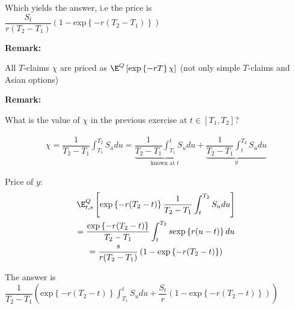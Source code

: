 \noindent Which yields the answer, i.e the price is $\dfrac{S_t}{r(T_2-T_1)}\left(1-\text{exp}\left\{-r(T_2-T_1)\right\}\right)$
\par\bigskip
\noindent\textbf{Remark:}\par
\noindent All $T$-claims $\chi$ are priced as $\E^Q\left[\text{exp}\left\{-rT\right\}\chi\right]$ (not only simple $T$-claims and Asian options)
\par\bigskip
\noindent\textbf{Remark:}\par
\noindent What is the value of $\chi$ in the previous exercise at $t \in[T_1,T_2]$?\par
\begin{equation*}
  \begin{gathered}
    \chi = \dfrac{1}{T_2-T_1}\int_{T_1}^{T_2}S_udu = \underbrace{\dfrac{1}{T_2-T_1}\int_{T_1}^{t}S_udu}_{\text{known at $t$}}+\underbrace{\dfrac{1}{T_2-T_1}\int_{t}^{T_2}S_udu}_{y}
  \end{gathered}
\end{equation*}
\par\bigskip
\noindent Price of $y$:
\begin{equation*}
  \begin{gathered}
    \E_{t,s}^Q\left[\text{exp}\left\{-r(T_2-t)\right\}\dfrac{1}{T_2-T_1}\int_{t}^{T_2}S_udu\right]\\
    =\dfrac{\text{exp}\left\{-r(T_2-t)\right\}}{T_2-T_1}\int_{t}^{T_2}s\text{exp}\left\{r(u-t)\right\}du\\
    = \dfrac{s}{r(T_2-T_1)}\left(1-\text{exp}\left\{-r(T_2-t)\right\}\right)
  \end{gathered}
\end{equation*}\par
\noindent The answer is $\dfrac{1}{T_2-T_1}\left(\text{exp}\left\{-r(T_2-t)\right\}\int_{T_1}^{t}S_udu+\dfrac{S_t}{r}\left(1-\text{exp}\left\{-r(T_2-t)\right\}\right)\right)$
\par\bigskip
